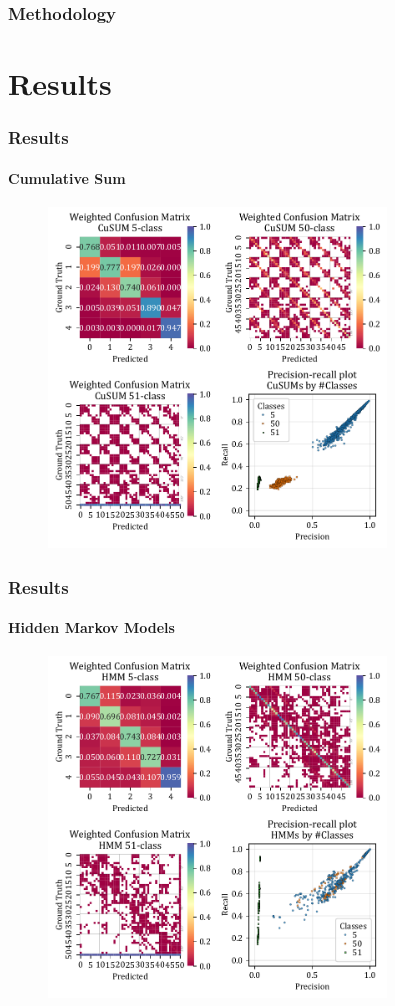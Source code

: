 \documentclass[xcolor={svgnames,table},10pt,fleqn]{beamer}
\begin{document}
\begin{frame}
    \frametitle{Methodology}
\end{frame}

\section{Results}
\begin{frame}
    \frametitle{Results}
    \framesubtitle{Cumulative Sum}
    \begin{figure}[h]
        \centering
        \includegraphics[width=0.8\textwidth]{imgs/05_mean_conf_mat_cusum.pdf}
    \end{figure}
\end{frame}

\begin{frame}
    \frametitle{Results}
    \framesubtitle{Hidden Markov Models}
    \begin{figure}[h]
        \centering
        \includegraphics[width=0.8\textwidth]{imgs/05_mean_conf_mat_hmm.pdf}
    \end{figure}
\end{frame}
\end{document}
